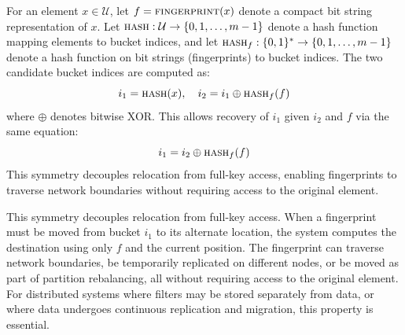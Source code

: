 \begin{definition}
    For an element $x \in \mathcal{U}$, let $f = \textsc{fingerprint}(x)$ denote a compact bit string representation of $x$. Let $\textsc{hash}: \mathcal{U} \to \{0, 1, \ldots, m-1\}$ denote a hash function mapping elements to bucket indices, and let $\textsc{hash}_f: \{0,1\}^* \to \{0, 1, \ldots, m-1\}$ denote a hash function on bit strings (fingerprints) to bucket indices. The two candidate bucket indices are computed as:
    \begin{equation*}
        i_1 = \textsc{hash}(x), \quad i_2 = i_1 \oplus \textsc{hash}_f(f)
    \end{equation*}
    where $\oplus$ denotes bitwise XOR. This allows recovery of $i_1$ given $i_2$ and $f$ via the same equation:
    $$i_1 = i_2 \oplus \textsc{hash}_f(f)$$
    This symmetry decouples relocation from full-key access, enabling fingerprints to traverse network boundaries without requiring access to the original element.
\end{definition}

This symmetry decouples relocation from full-key access. When a fingerprint must be moved from bucket $i_1$ to its alternate location, the system computes the destination using only $f$ and the current position. The fingerprint can traverse network boundaries, be temporarily replicated on different nodes, or be moved as part of partition rebalancing, all without requiring access to the original element. For distributed systems where filters may be stored separately from data, or where data undergoes continuous replication and migration, this property is essential.

